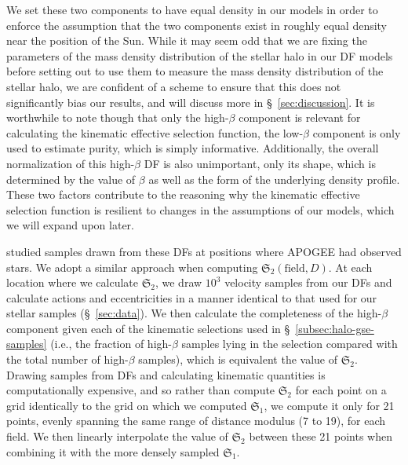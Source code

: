  We set these two components to have equal density in our models in order to enforce the assumption that the two components exist in roughly equal density near the position of the Sun. While it may seem odd that we are fixing the parameters of the mass density distribution of the stellar halo in our DF models before setting out to use them to measure the mass density distribution of the stellar halo, we are confident of a scheme to ensure that this does not significantly bias our results, and will discuss more in \S~\ref{sec:discussion}. It is worthwhile to note though that only the high-$\beta$ component is relevant for calculating the kinematic effective selection function, the low-$\beta$ component is only used to estimate purity, which is simply informative. Additionally, the overall normalization of this high-$\beta$ DF is also unimportant, only its shape, which is determined by the value of $\beta$ as well as the form of the underlying density profile. These two factors contribute to the reasoning why the kinematic effective selection function is resilient to changes in the assumptions of our models, which we will expand upon later.

\cite{lane22} studied samples drawn from these DFs at positions where APOGEE had observed stars. We adopt a similar approach when computing $\mathfrak{S}_{2}(\mathrm{field},D)$. At each location where we calculate $\mathfrak{S}_{2}$, we draw $10^{3}$ velocity samples from our DFs and calculate actions and eccentricities in a manner identical to that used for our stellar samples (\S~\ref{sec:data}). We then calculate the completeness of the high-$\beta$ component given each of the kinematic selections used in \S~\ref{subsec:halo-gse-samples} (i.e., the fraction of high-$\beta$ samples lying in the selection compared with the total number of high-$\beta$ samples), which is equivalent the value of $\mathfrak{S}_{2}$. Drawing samples from DFs and calculating kinematic quantities is computationally expensive, and so rather than compute $\mathfrak{S}_{2}$ for each point on a grid identically to the grid on which we computed $\mathfrak{S}_{1}$, we compute it only for 21 points, evenly spanning the same range of distance modulus (7 to 19), for each field. We then linearly interpolate the value of $\mathfrak{S}_{2}$ between these 21 points when combining it with the more densely sampled $\mathfrak{S}_{1}$. 


